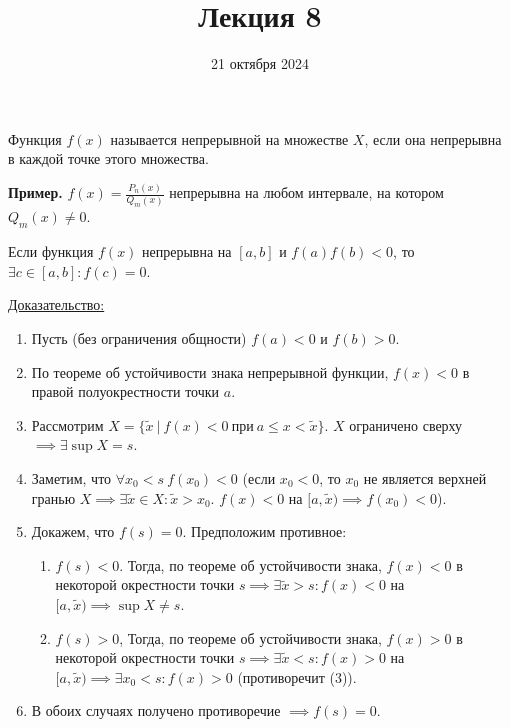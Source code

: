 \documentclass{article}
\title{Лекция 8}
\author{}
\date{21 октября 2024}
\begin{document}
\maketitle

\begin{definition}
    Функция \(f(x)\) называется непрерывной на множестве \(X\), если она непрерывна в каждой точке этого множества.  
\end{definition}
\noindent
\textbf{Пример.} \(\displaystyle f(x) = \frac{P_{n}(x)}{Q_{m}(x)}\) непрерывна на любом интервале, на котором \(Q_{m}(x) \neq 0\).   

\begin{theorem}
    Если функция \(f(x)\) непрерывна на \({[a, b]}\) и \(f(a)f(b) < 0\), то \(\exists c \in {[a, b]}: f(c) = 0\).  
\end{theorem}
\noindent
\underline{Доказательство:}
\begin{enumerate}
    \item Пусть (без ограничения общности) \(f(a) < 0\) и \(f(b) > 0\).
    \item По теореме об устойчивости знака непрерывной функции, \(f(x) < 0\) в правой полуокрестности точки \(a\).
    \item Рассмотрим \(\displaystyle X = \{\widetilde{x}\ |\ f(x) < 0\ \text{при}\ a \leq x < \widetilde{x}\}\). \(X\) ограничено сверху \(\implies \exists \sup{X} = s\).
    \item Заметим, что \(\displaystyle \forall x_{0} < s\ f(x_{0}) < 0\) (если \(\displaystyle x_{0} < 0\), то \(\displaystyle x_{0}\) не является верхней гранью \(\displaystyle X \implies \exists \widetilde{x} \in X: \widetilde{x} > x_{0}\). \(\displaystyle f(x) < 0\) на \(\displaystyle {[a, \widetilde{x})} \implies \displaystyle f(x_{0}) < 0\)).
    \item Докажем, что \(f(s) = 0\). Предположим противное:
    \begin{enumerate}
    \item \(f(s) < 0\). Тогда, по теореме об устойчивости знака, \(f(x) < 0\) в некоторой окрестности точки \(s \implies \exists \widetilde{x} > s: f(x) < 0\) на \({[a, \widetilde{x})} \implies \sup{X} \neq s\).   
    \item \(f(s) > 0\), Тогда, по теореме об устойчивости знака, \(f(x) > 0\) в некоторой окрестности точки \(s \implies \exists \widetilde{x} < s: f(x) > 0\) на \({[a, \widetilde{x})} \implies \exists x_{0} < s: f(x) > 0\) (противоречит (3)).
    \end{enumerate}
    \item В обоих случаях получено противоречие \(\implies f(s) = 0\).
\end{enumerate}
\end{document}
